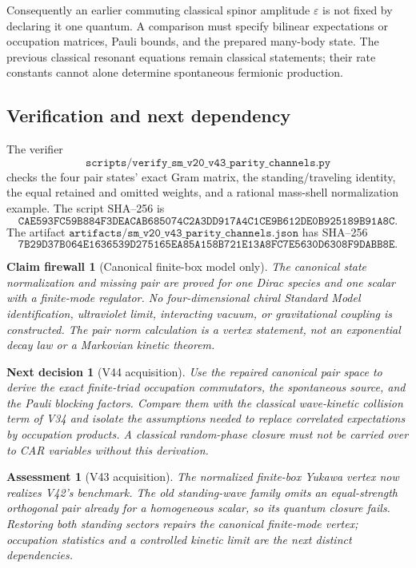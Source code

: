 \documentclass[11pt]{article}
\newtheorem{firewall}[theorem]{Claim firewall}
\newtheorem{decision}[theorem]{Next decision}
\newtheorem{assessment}[theorem]{Assessment}
\theoremstyle{remark}
\begin{document}
Consequently an earlier commuting classical spinor amplitude
\(\varepsilon\) is not fixed by declaring it one quantum.  A comparison
must specify bilinear expectations or occupation matrices, Pauli
bounds, and the prepared many-body state.  The previous classical
resonant equations remain classical statements; their rate constants
cannot alone determine spontaneous fermionic production.

\subsection{Verification and next dependency}

The verifier
\[
 \texttt{scripts/verify\_sm\_v20\_v43\_parity\_channels.py}
\]
checks the four pair states' exact Gram matrix, the standing/traveling
identity, the equal retained and omitted weights, and a rational
mass-shell normalization example.  The script SHA--256 is
\[
\texttt{CAE593FC59B884F3DEACAB685074C2A3DD917A4C1CE9B612DE0B925189B91A8C}.
\]
The artifact
\(\texttt{artifacts/sm\_v20\_v43\_parity\_channels.json}\)
has SHA--256
\[
\texttt{7B29D37B064E1636539D275165EA85A158B721E13A8FC7E5630D6308F9DABB8E}.
\]

\begin{firewall}[Canonical finite-box model only]
\label{fire:v20v43}
The canonical state normalization and missing pair are proved for
one Dirac species and one scalar with a finite-mode regulator.
No four-dimensional chiral Standard Model identification, ultraviolet
limit, interacting vacuum, or gravitational coupling is constructed.
The pair norm calculation is a vertex statement, not an exponential
decay law or a Markovian kinetic theorem.
\end{firewall}

\begin{decision}[V44 acquisition]
\label{dec:v20v43-next}
Use the repaired canonical pair space to derive the exact finite-triad
occupation commutators, the spontaneous source, and the Pauli blocking
factors.  Compare them with the classical wave-kinetic collision term
of V34 and isolate the assumptions needed to replace correlated
expectations by occupation products.  A classical random-phase closure
must not be carried over to CAR variables without this derivation.
\end{decision}

\begin{assessment}[V43 acquisition]
\label{ass:v20v43}
The normalized finite-box Yukawa vertex now realizes V42's benchmark.
The old standing-wave family omits an equal-strength orthogonal pair
already for a homogeneous scalar, so its quantum closure fails.
Restoring both standing sectors repairs the canonical finite-mode
vertex; occupation statistics and a controlled kinetic limit are the
next distinct dependencies.
\end{assessment}
\end{document}
